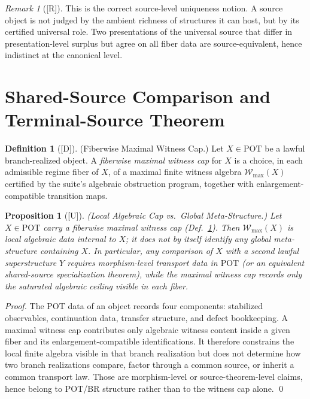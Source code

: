 \documentclass[12pt,oneside]{amsbook}
\theoremstyle{plain}
\newtheorem{proposition}[theorem]{Proposition}
\theoremstyle{definition}
\newtheorem{definition}[theorem]{Definition}
\theoremstyle{remark}
\newtheorem{remark}[theorem]{Remark}
\newcommand{\status}[1]{\textup{[#1]}}
\begin{document}
\begin{remark}[\status{R}]\label{rmk:uniqueness-notion}
This is the correct source-level uniqueness notion.  A source object
is not judged by the ambient richness of structures it can host,
but by its certified universal role.  Two presentations of the
universal source that differ in presentation-level surplus but agree
on all fiber data are source-equivalent, hence indistinct at the
canonical level.
\end{remark}

\section{Shared-Source Comparison and Terminal-Source Theorem}
\label{sec:shared-source}

\begin{definition}[\status{D}]\label{def:fiberwise-witness-cap}
\textup{(Fiberwise Maximal Witness Cap.)}
Let $X \in \mathrm{POT}$ be a lawful branch-realized object.  A
\emph{fiberwise maximal witness cap} for $X$ is a choice, in each
admissible regime fiber of $X$, of a maximal finite witness algebra
$\mathcal{W}_{\max}(X)$ certified by the suite's algebraic
obstruction program, together with enlargement-compatible transition
maps.
\end{definition}

\begin{proposition}[\status{U}]\label{prop:local-cap-vs-meta}
\textup{(Local Algebraic Cap vs.\ Global Meta-Structure.)}
Let $X \in \mathrm{POT}$ carry a fiberwise maximal witness cap
(Def.~\ref{def:fiberwise-witness-cap}).  Then $\mathcal{W}_{\max}(X)$
is local algebraic data internal to $X$; it does not by itself
identify any global meta-structure containing $X$.  In particular,
any comparison of $X$ with a second lawful superstructure $Y$ requires
morphism-level transport data in $\mathrm{POT}$ (or an equivalent
shared-source specialization theorem), while the maximal witness cap
records only the saturated algebraic ceiling visible in each fiber.
\end{proposition}

\begin{proof}
The POT data of an object records four components: stabilized
observables, continuation data, transfer structure, and defect
bookkeeping.  A maximal witness cap contributes only algebraic
witness content inside a given fiber and its enlargement-compatible
identifications.  It therefore constrains the local finite algebra
visible in that branch realization but does not determine how two
branch realizations compare, factor through a common source, or
inherit a common transport law.  Those are morphism-level or
source-theorem-level claims, hence belong to
$\mathrm{POT}$/BR structure rather than to the witness cap alone.
\qed
\end{proof}
\end{document}
